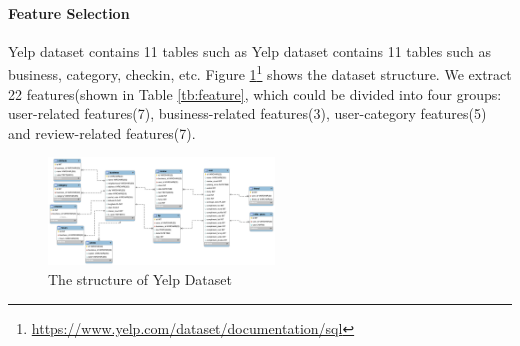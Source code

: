 \documentclass{vgtc}                          %
\begin{document}
\paragraph{Feature Selection}
Yelp dataset contains 11 tables such as Yelp dataset contains 11 tables such as business, category, checkin, etc. Figure \ref{fig:data}\footnote{\url{https://www.yelp.com/dataset/documentation/sql}} shows the dataset structure. We extract 22 features(shown in Table \ref{tb:feature}, which could be divided into four groups: user-related features(7), business-related features(3), user-category features(5) and review-related features(7).

\begin{figure}[h]
  \centering
  \includegraphics[width=6cm]{data.png}
  \caption{The structure of Yelp Dataset}
  \label{fig:data}
\end{figure}
\newcommand{\tabincell}[2]{\begin{tabular}{@{}#1@{}}#2\end{tabular}}
\end{document}

